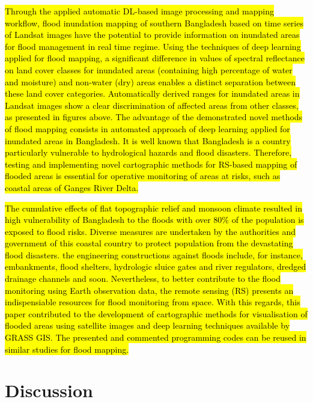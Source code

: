 \documentclass[water,article,submit,pdftex,moreauthors]{Definitions/mdpi}
\begin{document}
\hl{Through the applied automatic DL-based image processing and mapping workflow, flood inundation mapping of southern Bangladesh based on time series of Landsat images have the potential to provide information on inundated areas for flood management in real time regime. Using the techniques of deep learning applied for flood mapping, a significant difference in values of spectral reflectance on land cover classes for inundated areas (containing high percentage of water and moisture) and non-water (dry) areas enables a distinct separation between these land cover categories. Automatically derived ranges for inundated areas in Landsat images show a clear discrimination of affected areas from other classes, as presented in figures above. The advantage of the demonstrated novel methods of flood mapping consists in automated approach of deep learning applied for inundated areas in Bangladesh. It is well known that Bangladesh is a country particularly vulnerable to hydrological hazards and flood disasters. Therefore, testing and implementing novel cartographic methods for RS-based mapping of flooded areas is essential for operative monitoring of areas at risks, such as coastal areas of Ganges River Delta.} 

\hl{The cumulative effects of flat topographic relief and monsoon climate resulted in high vulnerability of Bangladesh to the floods with over 80\% of the population is exposed to flood risks. Diverse measures are undertaken by the authorities and government of this coastal country to protect population from the devastating flood disasters. the engineering constructions against floods include, for instance, embankments, flood shelters, hydrologic sluice gates and river regulators, dredged drainage channels and soon. Nevertheless, to better contribute to the flood monitoring using Earth observation data, the remote sensing (RS) presents an indispensiable resources for flood monitoring from space. With this regards, this paper contributed to the development of cartographic methods for visualisation of flooded areas using satellite images and deep learning techniques available by GRASS GIS. The presented and commented programming codes can be reused in similar studies for flood mapping.}
 
\section{Discussion}
\end{document}
